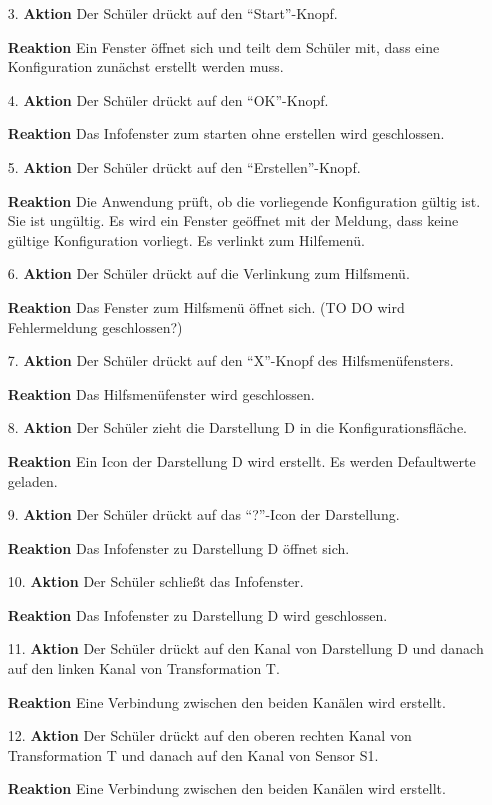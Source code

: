 \documentclass[parskip=full]{scrartcl}
\begin{document}
\begin{itemize}
\begin{itemize}
\item [3.]\textbf{Aktion} Der Schüler drückt auf den "`Start"'-Knopf.
\item []\textbf{Reaktion} Ein Fenster öffnet sich und teilt dem Schüler mit, dass eine Konfiguration zunächst erstellt werden muss.
\item [4.]\textbf{Aktion} Der Schüler drückt auf den "`OK"'-Knopf.
\item []\textbf{Reaktion} Das Infofenster zum starten ohne erstellen wird geschlossen.
\item [5.]\textbf{Aktion} Der Schüler drückt auf den "`Erstellen"'-Knopf.
\item []\textbf{Reaktion} Die Anwendung prüft, ob die vorliegende Konfiguration gültig ist. Sie ist ungültig. Es wird ein Fenster geöffnet mit der Meldung, dass keine gültige Konfiguration vorliegt. Es verlinkt zum Hilfemenü.
\item [6.]\textbf{Aktion} Der Schüler drückt auf die Verlinkung zum Hilfsmenü.
\item []\textbf{Reaktion} Das Fenster zum Hilfsmenü öffnet sich. (TO DO wird Fehlermeldung geschlossen?)
\item [7.]\textbf{Aktion} Der Schüler drückt auf den "`X"'-Knopf des Hilfsmenüfensters. 
\item []\textbf{Reaktion} Das Hilfsmenüfenster wird geschlossen.
\item [8.]\textbf{Aktion} Der Schüler zieht die Darstellung D in die Konfigurationsfläche.
\item []\textbf{Reaktion} Ein Icon der Darstellung D wird erstellt. Es werden Defaultwerte geladen.
\item [9.]\textbf{Aktion} Der Schüler drückt auf das "`?"'-Icon der Darstellung.
\item []\textbf{Reaktion} Das Infofenster zu Darstellung D öffnet sich.
\item [10.]\textbf{Aktion} Der Schüler schließt das Infofenster.
\item []\textbf{Reaktion} Das Infofenster zu Darstellung D wird geschlossen.
\item [11.]\textbf{Aktion} Der Schüler drückt auf den Kanal von Darstellung D und danach auf den linken Kanal von Transformation T.
\item []\textbf{Reaktion} Eine Verbindung zwischen den beiden Kanälen wird erstellt.
\item [12.]\textbf{Aktion} Der Schüler drückt auf den oberen rechten Kanal von Transformation T und danach auf den Kanal von Sensor S1.
\item []\textbf{Reaktion} Eine Verbindung zwischen den beiden Kanälen wird erstellt.

\end{itemize}
\end{itemize}
\end{document}
